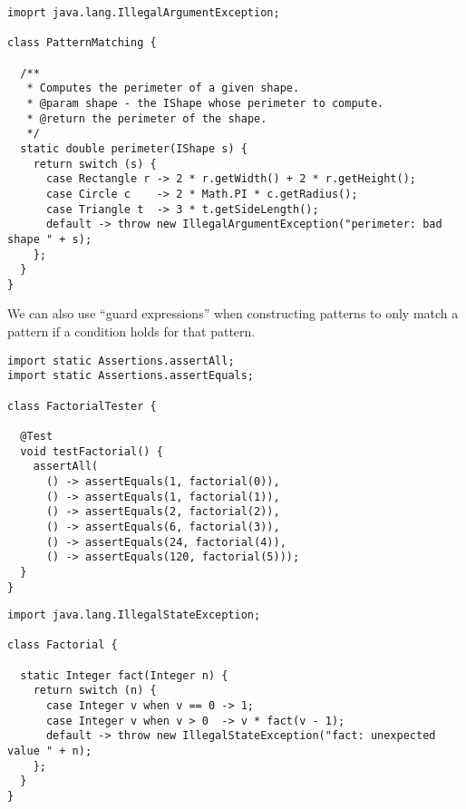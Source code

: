 \begin{lstlisting}[language=MyJava]
imoprt java.lang.IllegalArgumentException;

class PatternMatching {

  /**
   * Computes the perimeter of a given shape.
   * @param shape - the IShape whose perimeter to compute.
   * @return the perimeter of the shape.
   */
  static double perimeter(IShape s) {
    return switch (s) {
      case Rectangle r -> 2 * r.getWidth() + 2 * r.getHeight();
      case Circle c    -> 2 * Math.PI * c.getRadius();
      case Triangle t  -> 3 * t.getSideLength();
      default -> throw new IllegalArgumentException("perimeter: bad shape " + s);
    };
  }
}
\end{lstlisting}

We can also use ``guard expressions'' when constructing patterns to only match a pattern if a condition holds for that pattern.


\begin{lstlisting}[language=MyJava]
import static Assertions.assertAll;
import static Assertions.assertEquals;

class FactorialTester {

  @Test
  void testFactorial() {
    assertAll(
      () -> assertEquals(1, factorial(0)),
      () -> assertEquals(1, factorial(1)),
      () -> assertEquals(2, factorial(2)),
      () -> assertEquals(6, factorial(3)),
      () -> assertEquals(24, factorial(4)),
      () -> assertEquals(120, factorial(5)));
  }
}
\end{lstlisting}

\begin{lstlisting}[language=MyJava]
import java.lang.IllegalStateException;

class Factorial {

  static Integer fact(Integer n) {
    return switch (n) {
      case Integer v when v == 0 -> 1;
      case Integer v when v > 0  -> v * fact(v - 1);
      default -> throw new IllegalStateException("fact: unexpected value " + n);
    };
  }
}
\end{lstlisting}

